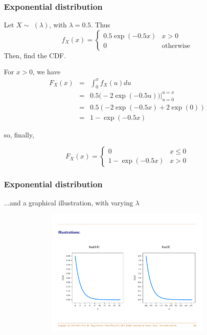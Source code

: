 \documentclass[notes=show,smaller,handout]{beamer}
\begin{document}
\begin{frame}
\frametitle{Exponential distribution}
\begin{small}
\begin{example}
Let $X\sim$ $(\lambda)$, with $\lambda =0.5$. Thus 
$$f_X(x) = \left\{ \begin{array}{ll}
0.5 \exp (-0.5x) & x>0\\
0 & \text{otherwise}
\end{array} \right.$$
Then, find the CDF.
%
\vspace{0.1cm}

For $x>0$, we have
\begin{eqnarray*}
F_{X}(x) & = & \int_{0}^{x}f_{X}(u)du\\
& = & 0.5\Big( -2\exp (-0.5u)\Big) \bigl|_{u=0}^{u=x}\\
& = & 0.5(-2\exp (-0.5x)+2\exp (0))\\
& = & 1-\exp (-0.5x)
\end{eqnarray*}

so, finally, 

$$F_X(x) = \left\{ \begin{array}{ll}
0 & x \leq 0 \\
1-\exp (-0.5x)& x>0
\end{array} \right.$$
\end{example}
\end{small}
\end{frame}%



\begin{frame}
\frametitle{Exponential distribution}


\begin{example} [cont'd]

...and a graphical illustration, with varying $\lambda$

\begin{figure}[ptb]\centering
\includegraphics[height=2.4856in, width=4.5in]{Exp_Diego.pdf}%
\end{figure}%

\end{example}
\end{frame}%
\end{document}
